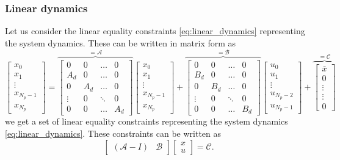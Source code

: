 \documentclass[a4paper,12pt,fleqn]{book}
\newcommand{\Np}{{N_p}}
\begin{document}
\subsubsection{Linear dynamics}
Let us consider the linear equality constraints \eqref{eq:linear_dynamics} representing the system dynamics. These can 
be written in matrix form as
\begin{equation}
\begin{bmatrix}
x_0\\
x_1\\
\vdots\\
x_{\Np-1}\\
x_{\Np}
\end{bmatrix}=
\overbrace{
\begin{bmatrix}
 0      &0      &\dots  &0\\
 A_d    &0      &\dots  & 0\\
 0      &A_d    &\dots  &0\\
 \vdots &0      &\ddots & 0\\
 0      &0      &\dots  &A_d
\end{bmatrix}
}^{=\mathcal{A}}
\begin{bmatrix}
x_0\\
x_1\\
\vdots\\
x_{\Np-1}\\
x_{\Np} 
\end{bmatrix} +
\overbrace{
\begin{bmatrix}
 0      &0      &\dots  &0\\
 B_d    &0      &\dots  & 0\\
 0      &B_d    &\dots  &0\\
 \vdots &0      &\ddots & 0\\
 0      &0      &\dots  &B_d
\end{bmatrix}
}^{=\mathcal B}
\begin{bmatrix}
u_0\\
u_1\\
\vdots\\
u_{\Np-2}\\
u_{\Np-1} 
\end{bmatrix} +
\overbrace{
\begin{bmatrix}
\bar x\\
0\\
\vdots\\
\vdots \\
0 
\end{bmatrix}
}^{=\mathcal{C}}
\end{equation}
we get a set of linear equality constraints representing the system dynamics \eqref{eq:linear_dynamics}.
These constraints can be written as
\begin{equation}
 \begin{bmatrix}
  (\mathcal{A}-I) & \mathcal{B}
 \end{bmatrix}
 \begin{bmatrix}
  x\\
  u
 \end{bmatrix}
 = \mathcal{C}.
\end{equation}
\end{document}
